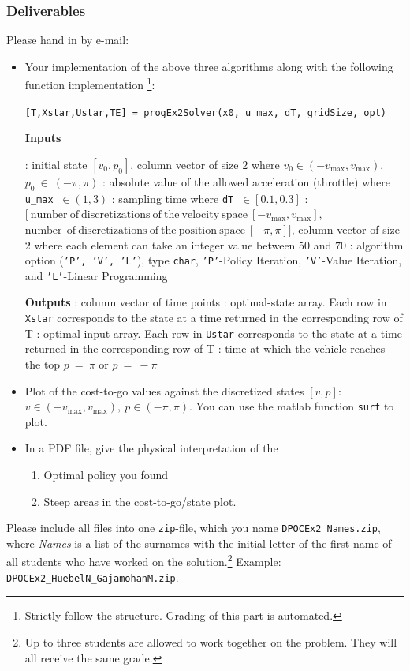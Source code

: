 \documentclass[uebung]{ETHIDSCprogramming_dpoc}
\begin{document}
\subsubsection*{Deliverables}
Please hand in by e-mail:
\begin{itemize}
\item Your implementation of the above three algorithms along with the following function implementation \footnote{Strictly follow the structure. Grading of this part is automated.}:
 
{\tt [T,Xstar,Ustar,TE] = progEx2Solver(x0, u\_max, dT, gridSize, opt)} 

\textbf{Inputs}

: initial state $[v_0, p_0]$, column vector of size $2$ where $v_0 \in (-v_\mathrm{max},v_\mathrm{max})$, $p_0~\in~(-\pi,\pi)$
: absolute value of the allowed acceleration (throttle) where {\tt u\_max} $\ \in (1,3)$ 
: sampling time where {\tt dT} $\ \in [0.1,0.3]$
: $[\ \mathrm{number\ of\ discretizations\ of\ the\ velocity\ space}\ [-v_\mathrm{max},v_\mathrm{max}]$, $\mathrm{number\ \ of\ discretizations\ of\ the\ position\ space}\ [-\pi,\pi]]$, column vector of size $2$ where each element can take an integer value between $50$ and $70$
: algorithm option ({\tt 'P', 'V', 'L'}), type {\tt char}, {\tt 'P'}-Policy Iteration, {\tt 'V'}-Value Iteration, and {\tt 'L'}-Linear Programming

\textbf{Outputs}
: column vector of time points
: optimal-state array. Each row in {\tt Xstar} corresponds to the state at a time returned in the corresponding row of T
: optimal-input array. Each row in {\tt Ustar} corresponds to the state at a time returned in the corresponding row of T
: time at which the vehicle reaches the top $p\ =\ \pi $ or  $p\ =\ -\pi $
\item Plot of the cost-to-go values against the discretized  states $[v, p]$: $v \in (-v_\mathrm{max},v_\mathrm{max}),\ p \in (-\pi,\pi)$. You can use the matlab function {\tt surf} to plot.
\item In a PDF file, give the physical interpretation of the
\begin{enumerate}
\item Optimal policy you found 
\item Steep areas in the cost-to-go/state plot.
\end{enumerate}
\end{itemize}
Please include all files into one {\tt zip}-file, which you name {\tt DPOCEx2\_Names.zip}, where {\it Names} 
is a list of the surnames with the initial letter of the first name of all students who have worked
on the solution.\footnote{Up to three students are allowed to work together on the problem.  They will all receive the same grade.} 
Example:  {\tt DPOCEx2\_HuebelN\_GajamohanM.zip}.
\end{document}
